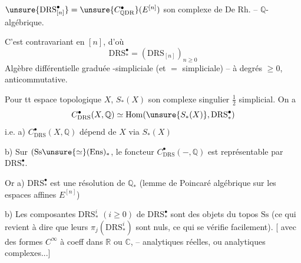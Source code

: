 $\unsure{\mathrm{DRS}^\bullet_{[n]}}=\unsure{C^\bullet_{\mathbb Q\mathrm{DR}}}(E^{[n]})$ son complexe de De Rh. -- $\mathbb Q$-algébrique.

C'est contravariant en $[n]$, d'où
\[
\mathrm{DRS}^\bullet_*=(\mathrm{DRS}_{[n]})_{n\geq0}
\]
Algèbre différentielle graduée -simpliciale (et $=$ simpliciale) -- à degrés $\geq0$, anticommutative.

Pour tt espace topologique $X$, $S_*(X)$ son complexe singulier $\frac12$ simplicial. On a
\[
C^\bullet_{\mathrm{DRS}}(X,\mathbb Q)\simeq\operatorname{Hom}(\unsure{S_*(X)},\mathrm{DRS}^\bullet_*)
\]
i.e. a) $C^\bullet_{\mathrm{DRS}}(X,\mathbb Q)$ dépend de $X$ via $S_*(X)$

b) Sur $(\mathrm{Ss}\unsure{\simeq}(\mathrm{Ens})_*$, le foncteur $C^\bullet_{\mathrm{DRS}}(-,\mathbb Q)$ est représentable par $\mathrm{DRS}^\bullet_*$.

Or a) $\mathrm{DRS}^\bullet_*$ est une résolution de $\mathbb Q_*$  (lemme de Poincaré algébrique sur les espaces affines $E^{[n]}$)

b) Les composantes $\mathrm{DRS}^i_*$ $(i\geq0)$ de $\mathrm{DRS}^\bullet_*$ sont des objets  du topos $\mathrm{Ss}$ (ce qui revient à dire que leurs $\pi_j(\mathrm{DRS}^i_*)$ sont nuls, ce qui se vérifie facilement). [ avec des formes $C^\infty$ à coeff dans $\mathbb R$ ou $\mathbb C$, -- analytiques réelles, ou analytiques complexes...]


